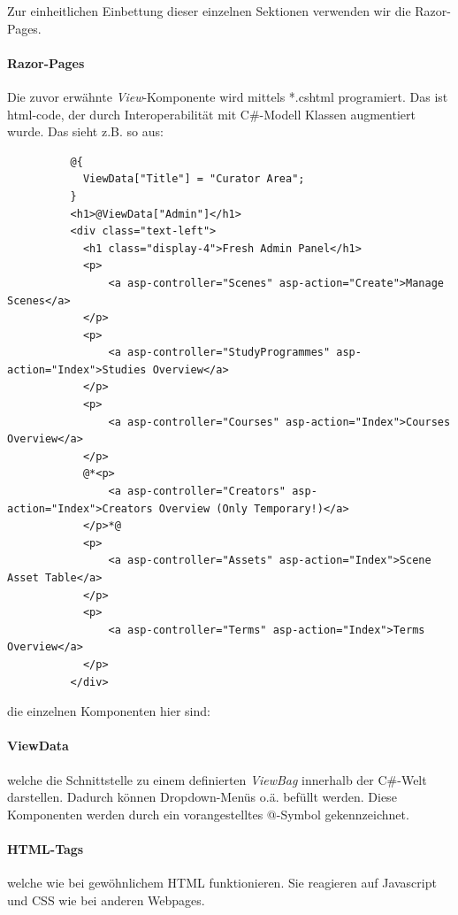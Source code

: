 \documentclass[titlepage, a4paper, 11pt]{scrartcl}
\begin{document}
          Zur einheitlichen Einbettung dieser einzelnen Sektionen verwenden wir die Razor-Pages.

        \paragraph{Razor-Pages}

        Die zuvor erwähnte \textit{View}-Komponente wird mittels *.cshtml programiert. Das ist html-code, der durch Interoperabilität mit C\#-Modell Klassen augmentiert wurde.
        Das sieht z.B. so aus:

        \begin{lstlisting}          
          @{
            ViewData["Title"] = "Curator Area";
          }
          <h1>@ViewData["Admin"]</h1>
          <div class="text-left">
            <h1 class="display-4">Fresh Admin Panel</h1>
            <p>
                <a asp-controller="Scenes" asp-action="Create">Manage Scenes</a>
            </p>
            <p>
                <a asp-controller="StudyProgrammes" asp-action="Index">Studies Overview</a>
            </p>
            <p>
                <a asp-controller="Courses" asp-action="Index">Courses Overview</a>
            </p>
            @*<p>
                <a asp-controller="Creators" asp-action="Index">Creators Overview (Only Temporary!)</a>
            </p>*@
            <p>
                <a asp-controller="Assets" asp-action="Index">Scene Asset Table</a>
            </p>
            <p>
                <a asp-controller="Terms" asp-action="Index">Terms Overview</a>
            </p>
          </div>
        \end{lstlisting}
        
        die einzelnen Komponenten hier sind:

        \paragraph{ViewData} welche die Schnittstelle zu einem definierten \textit{ViewBag} innerhalb der C\#-Welt darstellen. Dadurch können Dropdown-Menüs o.ä. befüllt werden.
        Diese Komponenten werden durch ein vorangestelltes @-Symbol gekennzeichnet.

        \paragraph{HTML-Tags} welche wie bei gewöhnlichem HTML funktionieren. Sie reagieren auf Javascript und CSS wie bei anderen Webpages.
\end{document}
